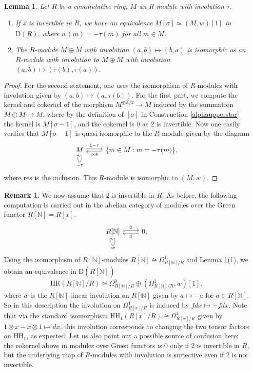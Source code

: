 \documentclass[10pt]{amsart}
\newtheorem{lem}[thm]{Lemma}
\theoremstyle{definition}
\newtheorem{rmk}[thm]{Remark}
\numberwithin{equation}{section}
\newcommand{\N}{\mathbb{N}}
\newcommand{\Z}{\mathbb{Z}}
\newcommand{\rD}{\mathrm{D}}
\newcommand{\ul}{\underline}
\newcommand{\HH}{\mathrm{HH}}
\newcommand{\HR}{\mathrm{HR}}
\newcommand{\res}{\mathrm{res}}
\begin{document}
\begin{lem}
\label{sigmaofRxy}
Let $R$ be a commutative ring, $M$ an $R$-module with involution $\tau$.
\begin{enumerate}
\item[\textup{(1)}] If 2 is invertible in $R$, 
we have an equivalence $\ul{M}[\sigma] \simeq \ul{(M,w)}[1]$ in $\rD(\ul{R})$, where $w(m)=-\tau(m)$ for all $m \in M$.
\item[\textup{(2)}] 
The $R$-module $M \oplus M$ with involution $(a,b) \mapsto (b,a)$ is isomorphic as an $R$-module with involution to $M \oplus M$ with involution  $(a,b) \mapsto (\tau(b),\tau(a))$.
\end{enumerate}
\end{lem}
\begin{proof}
For the second statement, one uses the isomorphism of $R$-modules with involution given by $(a,b) \mapsto (a,\tau(b))$.
For the first part,
we compute the kernel and cokernel of the morphism $\ul{M^{\oplus \Z/2}}\to \ul{M}$ induced by the summation $M\oplus M\to M$, where by the definition of $[\sigma]$ in Construction \ref{alphaupperstar} the kernel is $\ul{M}[\sigma -1]$, and the cokernel is $0$ as 2 is invertible.
Now one easily verifies that $\ul{M}[\sigma-1]$
is quasi-isomorphic to the $\ul{R}$-module given by the diagram
\[
\begin{tikzcd}
M\ar[loop below,"-\tau"]\ar[r,shift left=0.5ex,"1-\tau"]\ar[r,shift right=0.5ex,leftarrow,"\res"']&
\{m\in M:m=-\tau(m)\},
\end{tikzcd}
\]
where $\res$ is the inclusion.
This $\ul{R}$-module is isomorphic to $\ul{(M,w)}$.
\end{proof}

\begin{rmk}\label{omegaone}
We now assume that $2$ is invertible in $R$.
As before, the following computation is carried out in the abelian category of modules over the Green functor $\ul{R[\N]}=\ul{R[x]}$.
\[
\begin{tikzcd}
R[\N]\ar[loop below,"w"]\ar[r,shift left=0.5ex,"0"]\ar[r,shift right=0.5ex,leftarrow,"0"']&
0,
\end{tikzcd}
\]
Using the isomorphism of $R[\N]$-modules $R[\N] \cong \Omega^1_{R[\N]/R}$ and Lemma \ref{sigmaofRxy}(1),
we obtain an equivalence 
in $\rD(\ul{R[\N]})$
\[
\HR(R[\N]/R)
\simeq
\ul{\Omega^0_{R[\N]/R}}
\oplus
\ul{(\Omega^1_{R[\N]/R},w)}[1],
\]
where $w$ is the $R[\N]$-linear involution on $R[\N]$ given by $a\mapsto -a$ for $a\in R[\N]$.
So in this description the involution on $\Omega^1_{R[x]/R}$ is induced by $fdx \mapsto -fdx$.
Note that via the standard isomorphism 
$\HH_1(R[x]/R) \cong \Omega_{R[x]/R}^{1}$ given by $1 \otimes x - x \otimes 1 \mapsto dx$, this involution corresponds to changing the two tensor factors on $\HH_1$, as expected.
Let us also point out a possible source of confusion here: the cokernel above in modules over Green functors is $0$ only if $2$ is invertible in $R$, but the underlying map of $R$-modules with involution is surjective even if $2$ is not invertible.
\end{rmk}
\end{document}
